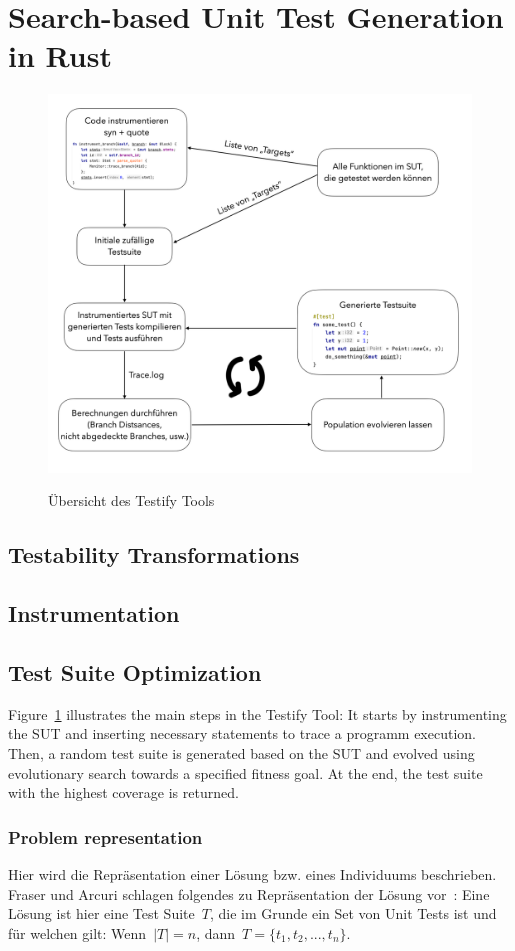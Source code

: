 \documentclass{article}
\begin{document}
\section{Search-based Unit Test Generation in Rust}
\begin{figure}[h]
\caption{Übersicht des Testify Tools}
\centering
\includegraphics[width=\textwidth]{testify-overview}
\label{fig:testify-overview}
\end{figure}
\subsection{Testability Transformations}
\subsection{Instrumentation}
\subsection{Test Suite Optimization}
Figure~\cref{fig:testify-overview} illustrates the main steps in the Testify Tool: It starts by instrumenting the \ac{SUT} and inserting necessary statements to trace a programm execution. Then, a random test suite is generated based on the \ac{SUT} and evolved using evolutionary search towards a specified fitness goal. At the end, the test suite with the highest coverage is returned. 

\subsubsection{Problem representation}
Hier wird die Repräsentation einer Lösung bzw. eines Individuums beschrieben. Fraser und Arcuri schlagen folgendes zu Repräsentation der Lösung vor~\cite{Fraser_2011}: Eine Lösung ist hier eine Test Suite~$T$, die im Grunde ein Set von Unit Tests ist und für welchen gilt: Wenn~$|T| = n$, dann~$T = \{t_1, t_2, ... ,t_n\}$. 
\end{document}
